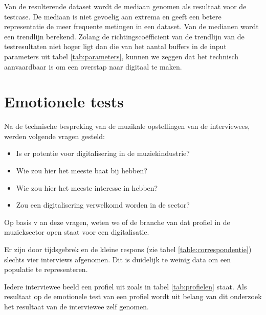 Van de resulterende dataset wordt de mediaan genomen als resultaat voor de testcase. De mediaan is niet gevoelig aan extrema en geeft een betere representatie de meer frequente metingen in een dataset. \autocite{median} Van de medianen wordt een trendlijn berekend. Zolang de richtingscoëfficient van de trendlijn van de testresultaten niet hoger ligt dan die van het aantal buffers in de input parameters uit tabel \ref{tab:parameters}, kunnen we zeggen dat het technisch aanvaardbaar is om een overstap naar digitaal te maken. 

\section{Emotionele tests}
\label{sec:methodologie:emotioneletests}

Na de technische bespreking van de muzikale opstellingen van de interviewees, werden volgende vragen gesteld:

\begin{itemize}
	\item Is er potentie voor digitalisering in de muziekindustrie?
	\item Wie zou hier het meeste baat bij hebben?
	\item Wie zou hier het meeste interesse in hebben?
	\item Zou een digitalisering verwelkomd worden in de sector?
\end{itemize}

Op basis v	an deze vragen, weten we of de branche van dat profiel in de muzieksector open staat voor een digitalisatie.

Er zijn door tijdsgebrek en de kleine respons (zie tabel \ref{table:correspondentie}) slechts vier interviews afgenomen. Dit is duidelijk te weinig data om een populatie te representeren.

Iedere interviewee beeld een profiel uit zoals in tabel \ref{tab:profielen} staat. Als resultaat op de emotionele test van een profiel wordt uit belang van dit onderzoek het resultaat van de interviewee zelf genomen.

